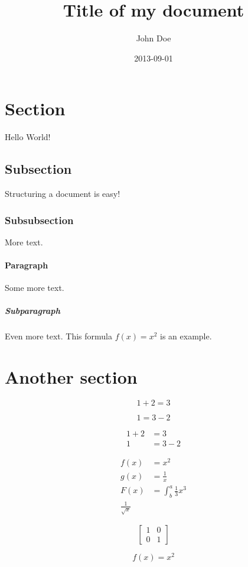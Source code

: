 \documentclass{article}
\title{Title of my document}
\date{2013-09-01}
\author{John Doe}
\begin{document}
\maketitle
{}
\newpage
{}

\section{Section}

Hello World!

\subsection{Subsection}

Structuring a document is easy!

\subsubsection{Subsubsection}

More text.

\paragraph{Paragraph}

Some more text.

\subparagraph{Subparagraph}

Even more text. This formula $f(x) = x^2$ is an example.

\section{Another section}


\begin{equation*}
  1 + 2 = 3 
\end{equation*}

\begin{equation*}
  1 = 3 - 2
\end{equation*}

\begin{align*}
  1 + 2 &= 3\\
  1 &= 3 - 2
\end{align*}

\begin{align*}
  f(x) &= x^2\\
  g(x) &= \frac{1}{x}\\
  F(x) &= \int^a_b \frac{1}{3}x^3\\
  \frac{1}{\sqrt{x}}
\end{align*}

\begin{equation*}
  \left[
  \begin{matrix}
  1 & 0\\
  0 & 1
  \end{matrix}
  \right]
\end{equation*}

\begin{equation}
  f(x) = x^2
\end{equation}
\end{document}
